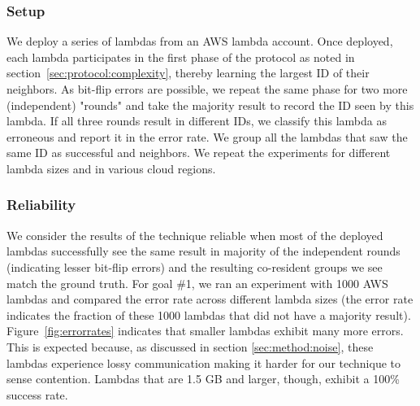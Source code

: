 \subsubsection{Setup}
\label{subsec:expsetup}
We deploy a series of lambdas from an AWS lambda account. 
Once deployed, each lambda participates in the first phase of the
protocol as noted in section~\ref{sec:protocol:complexity}, thereby learning the
largest ID of their neighbors. As bit-flip errors are possible, we repeat the
same phase for two more (independent) "rounds" and take the majority result to
record the ID seen by this lambda.  If all three rounds result in different
IDs, we classify this lambda as erroneous and report it in the error rate. We
group all the lambdas that saw the same ID as successful and neighbors. We
repeat the experiments for different lambda sizes and in various cloud regions.

\subsubsection{Reliability}
We consider the results of the technique reliable when most of the deployed
lambdas successfully see the same result in majority of the independent rounds
(indicating lesser bit-flip errors) and the resulting co-resident groups we
see match the ground truth.  For goal \#1, we ran an experiment with 1000 AWS
lambdas and compared the error rate across different lambda sizes (the error
rate indicates the fraction of these 1000 lambdas that did not have a majority
result). Figure~\ref{fig:errorrates} indicates that smaller lambdas exhibit many
more errors.  This is expected because, as discussed in section
\ref{sec:method:noise}, these lambdas experience lossy communication making it
harder for our technique to sense contention. Lambdas that are 1.5 GB and
larger, though, exhibit a 100\% success rate.

